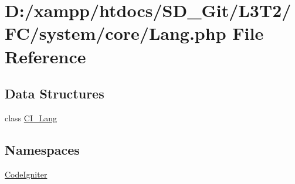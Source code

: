 \hypertarget{_lang_8php}{}\section{D\+:/xampp/htdocs/\+S\+D\+\_\+\+Git/\+L3\+T2/\+F\+C/system/core/\+Lang.php File Reference}
\label{_lang_8php}
\subsection*{Data Structures}
\begin{DoxyCompactItemize}
\item 
class \hyperlink{class_c_i___lang}{C\+I\+\_\+\+Lang}
\end{DoxyCompactItemize}
\subsection*{Namespaces}
\begin{DoxyCompactItemize}
\item 
 \hyperlink{namespace_code_igniter}{Code\+Igniter}
\end{DoxyCompactItemize}
